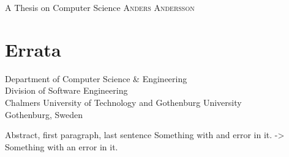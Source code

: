\documentclass[10pt,a4paper,onecolumn,english]{book}
\newcommand{\authorname}{Anders Andersson}
\newcommand{\mytitle}{A Thesis on Computer Science}
\newcommand{\division}{Software Engineering}
\begin{document}
\frontmatter

\begin{center} \Large \mytitle
\vspace{1cm}
\textsc{\authorname} \\
\end{center}

\thispagestyle{empty}
\section*{Errata}

Department of Computer Science \& Engineering\\
Division of \division \\
Chalmers University of Technology and Gothenburg University\\
Gothenburg, Sweden

\vspace{3cm}

Abstract, first paragraph, last sentence 
Something with and error in it. -> Something with an error in it.
\end{document}
